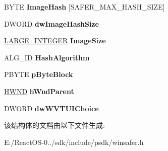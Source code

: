 \begin{DoxyCompactItemize}
B\+Y\+TE {\bfseries Image\+Hash} \mbox{[}S\+A\+F\+E\+R\+\_\+\+M\+A\+X\+\_\+\+H\+A\+S\+H\+\_\+\+S\+I\+ZE\mbox{]}
\item 
\mbox{\label{struct___s_a_f_e_r___c_o_d_e___p_r_o_p_e_r_t_i_e_s___v1_a84c98fcfc9b8f2d1d30ec3ea560dbefd}} 
D\+W\+O\+RD {\bfseries dw\+Image\+Hash\+Size}
\item 
\mbox{\label{struct___s_a_f_e_r___c_o_d_e___p_r_o_p_e_r_t_i_e_s___v1_a5c55040b92ef6d9bf8f6a8ae42ccdde3}} 
\hyperlink{union___l_a_r_g_e___i_n_t_e_g_e_r}{L\+A\+R\+G\+E\+\_\+\+I\+N\+T\+E\+G\+ER} {\bfseries Image\+Size}
\item 
\mbox{\label{struct___s_a_f_e_r___c_o_d_e___p_r_o_p_e_r_t_i_e_s___v1_a6440524fa278fe51285cc4d8f20c34d7}} 
A\+L\+G\+\_\+\+ID {\bfseries Hash\+Algorithm}
\item 
\mbox{\label{struct___s_a_f_e_r___c_o_d_e___p_r_o_p_e_r_t_i_e_s___v1_a93f68c43185bc376a79d61a42d5f8f65}} 
P\+B\+Y\+TE {\bfseries p\+Byte\+Block}
\item 
\mbox{\label{struct___s_a_f_e_r___c_o_d_e___p_r_o_p_e_r_t_i_e_s___v1_a913de31c0b876671c545b729d084dcf1}} 
\hyperlink{interfacevoid}{H\+W\+ND} {\bfseries h\+Wnd\+Parent}
\item 
\mbox{\label{struct___s_a_f_e_r___c_o_d_e___p_r_o_p_e_r_t_i_e_s___v1_af9dfca7a04cfae5c71b69ff924790aa8}} 
D\+W\+O\+RD {\bfseries dw\+W\+V\+T\+U\+I\+Choice}
\end{DoxyCompactItemize}


该结构体的文档由以下文件生成\+:\begin{DoxyCompactItemize}
\item 
E\+:/\+React\+O\+S-\/0../sdk/include/psdk/winsafer.\+h\end{DoxyCompactItemize}
